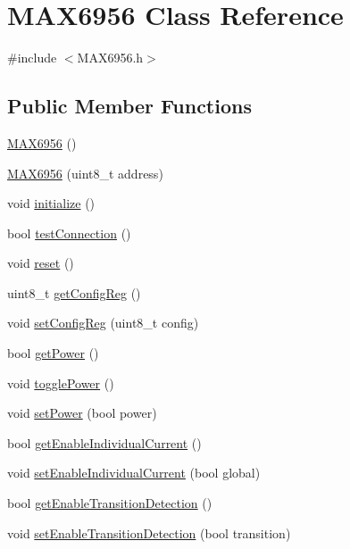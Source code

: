 \hypertarget{classMAX6956}{\section{M\-A\-X6956 Class Reference}
\label{classMAX6956}
}


{\ttfamily \#include $<$M\-A\-X6956.\-h$>$}

\subsection*{Public Member Functions}
\begin{DoxyCompactItemize}
\item 
\hyperlink{classMAX6956_a210d9e95978d61357db757cb80475bde}{M\-A\-X6956} ()
\item 
\hyperlink{classMAX6956_a1a7b33190871a09d81c5bec741b645b7}{M\-A\-X6956} (uint8\-\_\-t address)
\item 
void \hyperlink{classMAX6956_ad63e927adc2427b4b661f2422ddd40d8}{initialize} ()
\item 
bool \hyperlink{classMAX6956_a60bd352328d77e59a4d51a3c55d38a25}{test\-Connection} ()
\item 
void \hyperlink{classMAX6956_a3b9166eee826a876bbf29bc63b090fe7}{reset} ()
\item 
uint8\-\_\-t \hyperlink{classMAX6956_a5e787204b3f7bf8750376f5bdf77a971}{get\-Config\-Reg} ()
\item 
void \hyperlink{classMAX6956_ad06b9ed9f6e18f81d8379a6e10391ea4}{set\-Config\-Reg} (uint8\-\_\-t config)
\item 
bool \hyperlink{classMAX6956_acdc18c36735d8015651d4e3c75da4300}{get\-Power} ()
\item 
void \hyperlink{classMAX6956_a993f35d31d1f2489f9d2965c3886f848}{toggle\-Power} ()
\item 
void \hyperlink{classMAX6956_ae10ac505e3857d31ca3823225983a697}{set\-Power} (bool power)
\item 
bool \hyperlink{classMAX6956_abcfe81dd0ffc90284f19503b6366dcfb}{get\-Enable\-Individual\-Current} ()
\item 
void \hyperlink{classMAX6956_a35bc5701a290409144929e640cad1748}{set\-Enable\-Individual\-Current} (bool global)
\item 
bool \hyperlink{classMAX6956_a76e9ab35769854b3e4224499897601ec}{get\-Enable\-Transition\-Detection} ()
\item 
void \hyperlink{classMAX6956_a67b65b80e09a3225dd4f6413bfab2844}{set\-Enable\-Transition\-Detection} (bool transition)

\end{DoxyCompactItemize}
